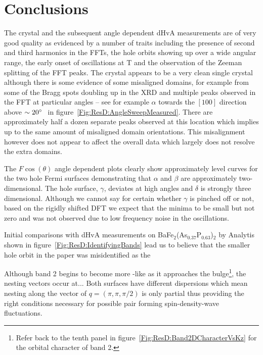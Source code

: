 
\section{Conclusions}

The \BaFeP crystal and the subsequent angle dependent \ac{dHvA} measurements are of very good quality as evidenced by a number of traits including the presence of second and third harmonics in the \acp{FFT}, the hole orbits showing up over a wide angular range, the early onset of oscillations at \unit[6]{T} and the observation of the Zeeman splitting of the \ac{FFT} peaks. The crystal appears to be a very clean single crystal although there is some evidence of some misaligned domains, for example from some of the Bragg spots doubling up in the \ac{XRD} and multiple peaks observed in the \ac{FFT} at particular angles -- see for example $\alpha$ towards the $[100]$ direction above $\sim 20\degree$ in figure~\ref{Fig:ResD:AngleSweepMeasured}. There are approximately half a dozen separate peaks observed at this location which implies up to the same amount of misaligned domain orientations. This misalignment however does not appear to affect the overall data which largely does not resolve the extra domains.

The $F\cos(\theta)$ angle dependent plots clearly show approximately level curves for the two hole Fermi surfaces demonstrating that $\alpha$ and $\beta$ are approximately two-dimensional. The hole surface, $\gamma$, deviates at high angles and $\delta$ is strongly three dimensional. Although we cannot say for certain whether $\gamma$ is pinched off or not, based on the rigidly shifted \ac{DFT} we expect that the minima to be small but not zero and was not observed due to low frequency noise in the oscillations.

Initial comparisons with \ac{dHvA} measurements on BaFe$_2$(As$_{0.37}$P$_{0.63}$)$_2$ by Analytis \etal shown in figure~\ref{Fig:ResD:IdentifyingBands} lead us to believe that the smaller hole orbit in the paper was misidentified as the

Although band 2 begins to become more \DzTwo-like as it approaches the bulge\footnote{Refer back to the tenth panel in figure~\ref{Fig:ResD:Band2DCharacterVsKz} for the orbital character of band 2.}, the nesting vectors occur at...
Both surfaces have different \kz dispersions which mean nesting along the vector of $q=(\pi, \pi, \pi/2)$ is only partial thus providing the right conditions necessary for possible pair forming spin-density-wave fluctuations. 


